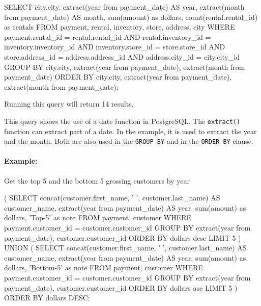 \begin{samepage}
\begin{sqlcode}
SELECT city.city, 
       extract(year from payment_date) AS year, 
       extract(month from payment_date) AS month, 
       sum(amount) as dollars, 
       count(rental.rental_id) as rentals
FROM payment, rental, inventory, store, address, city
WHERE payment.rental_id = rental.rental_id AND
      rental.inventory_id = inventory.inventory_id AND
      inventory.store_id = store.store_id AND
      store.address_id = address.address_id AND
      address.city_id = city.city_id
GROUP BY city.city, 
         extract(year from payment_date), 
         extract(month from payment_date)
ORDER BY city.city, 
         extract(year from payment_date), 
         extract(month from payment_date);
\end{sqlcode}
\end{samepage}

Running this query will return 14 results.

This query shows the use of a date function in PostgreSQL. The \texttt{extract()} function can extract part of a date. In the example, it is used to extract the year and the month. Both are also used in the \texttt{GROUP BY} and in the \texttt{ORDER BY} clause. 

\paragraph*{Example:} Get the top 5 and the bottom 5 grossing customers by year


\begin{samepage}
\begin{sqlcode}
( SELECT concat(customer.first_name, ' ', 
                customer.last_name) AS customer_name,
       extract(year from payment_date) AS year, 
       sum(amount) as dollars,
       'Top-5' as note
FROM payment, customer
WHERE payment.customer_id = customer.customer_id
GROUP BY extract(year from payment_date),
         customer.customer_id
ORDER BY dollars desc
LIMIT 5
) UNION (
SELECT concat(customer.first_name, ' ', 
              customer.last_name) AS customer_name,
       extract(year from payment_date) AS year, 
       sum(amount) as dollars,
       'Bottom-5' as note
FROM payment, customer
WHERE payment.customer_id = customer.customer_id
GROUP BY extract(year from payment_date),
         customer.customer_id
ORDER BY dollars asc
LIMIT 5 ) ORDER BY dollars DESC;
\end{sqlcode}
\end{samepage}

